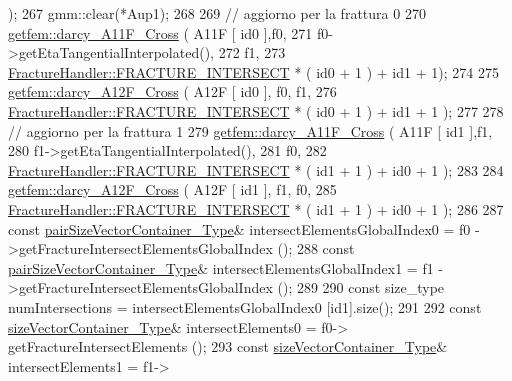 \begin{DoxyCode}
      );
267         gmm::clear(*Aup1);
268 
269         \textcolor{comment}{// aggiorno per la frattura 0}
270         \hyperlink{namespacegetfem_a9b6ded8fe1019aa04e66d2047d0f29dd}{getfem::darcy\_A11F\_Cross} ( A11F [ id0 ],f0,
271                                    f0->getEtaTangentialInterpolated(), 
272                                    f1,
273                                    \hyperlink{classFractureHandler_a495ad4fc72d0c47c8f0424842f1153aaa781cae3f3b99bf9357fed2833d315537}{FractureHandler::FRACTURE\_INTERSECT} *
       ( id0 + 1 ) + id1 + 1);
274 
275         \hyperlink{namespacegetfem_a88df6c0cb0765d5ab0fae27679cd30f4}{getfem::darcy\_A12F\_Cross} ( A12F [ id0 ], f0, f1,
276                                    \hyperlink{classFractureHandler_a495ad4fc72d0c47c8f0424842f1153aaa781cae3f3b99bf9357fed2833d315537}{FractureHandler::FRACTURE\_INTERSECT} *
       ( id0 + 1 ) + id1 + 1 );
277 
278         \textcolor{comment}{// aggiorno per la frattura 1}
279         \hyperlink{namespacegetfem_a9b6ded8fe1019aa04e66d2047d0f29dd}{getfem::darcy\_A11F\_Cross} ( A11F [ id1 ],f1,
280                                    f1->getEtaTangentialInterpolated(),
281                                    f0,
282                                    \hyperlink{classFractureHandler_a495ad4fc72d0c47c8f0424842f1153aaa781cae3f3b99bf9357fed2833d315537}{FractureHandler::FRACTURE\_INTERSECT} *
       ( id1 + 1 ) + id0 + 1 );
283 
284         \hyperlink{namespacegetfem_a88df6c0cb0765d5ab0fae27679cd30f4}{getfem::darcy\_A12F\_Cross} ( A12F [ id1 ], f1, f0,
285                                    \hyperlink{classFractureHandler_a495ad4fc72d0c47c8f0424842f1153aaa781cae3f3b99bf9357fed2833d315537}{FractureHandler::FRACTURE\_INTERSECT} *
       ( id1 + 1 ) + id0 + 1 );
286 
287         \textcolor{keyword}{const} \hyperlink{Core_8h_a9bc476e433f99b82a9c2b8560735c7b5}{pairSizeVectorContainer\_Type}& intersectElementsGlobalIndex0 = f0
      ->getFractureIntersectElementsGlobalIndex ();
288         \textcolor{keyword}{const} \hyperlink{Core_8h_a9bc476e433f99b82a9c2b8560735c7b5}{pairSizeVectorContainer\_Type}& intersectElementsGlobalIndex1 = f1
      ->getFractureIntersectElementsGlobalIndex ();
289         
290         \textcolor{keyword}{const} size\_type numIntersections = intersectElementsGlobalIndex0 [id1].size();
291         
292         \textcolor{keyword}{const} \hyperlink{Core_8h_a80e8381d86ecb0a7f4f87ff84d1a0be5}{sizeVectorContainer\_Type}& intersectElements0 = f0->
      getFractureIntersectElements ();
293         \textcolor{keyword}{const} \hyperlink{Core_8h_a80e8381d86ecb0a7f4f87ff84d1a0be5}{sizeVectorContainer\_Type}& intersectElements1 = f1->

\end{DoxyCode}
